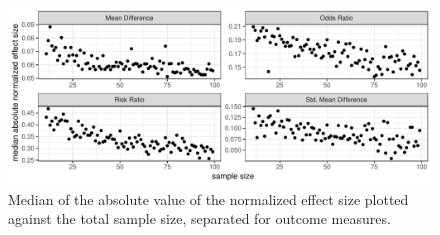 \documentclass[11pt,a4paper,twoside]{book}\usepackage[]{graphicx}\usepackage[]{color}
\newenvironment{knitrout}{}{} %
\begin{document}
\begin{figure}
\begin{knitrout}
\color{fgcolor}

{\centering \includegraphics[width=\textwidth-3cm]{figure/ch02_figunnamed-chunk-18-1} 

}



\end{knitrout}
\caption{Median of the absolute value of the normalized effect size plotted against the total sample size, separated for outcome measures.}
\label{effect.samplesize.separated}
\end{figure}

% 
\end{document}
